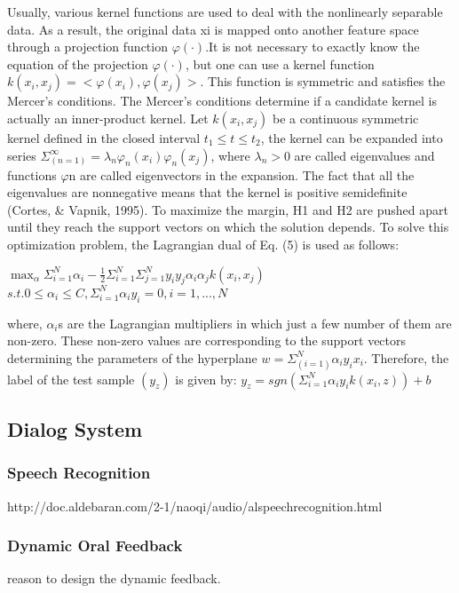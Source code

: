 Usually, various kernel functions are used to deal with the nonlinearly separable data. 
As a result, the original data xi is mapped onto another feature space through a 
projection function ${\varphi(\cdot)}$.It is not necessary to exactly know the equation of the 
projection ${\varphi(\cdot)}$, but one can use a kernel function ${k(x_i,x_j)=<\varphi(x_i),\varphi(x_j)>}$. 
This function is symmetric and satisfies the Mercer’s conditions. The Mercer’s conditions determine 
if a candidate kernel is actually an inner-product kernel. Let ${k(x_i,x_j)}$ be a continuous 
symmetric kernel defined in the closed interval ${t_1\leq t\leq t_2}$, the kernel can be expanded 
into series ${\Sigma_(n=1)^\infty = \lambda_n\varphi_n(x_i)\varphi_n(x_j)}$, where 
${\lambda_n > 0}$ are called eigenvalues and functions $\varphi$n are called eigenvectors in the expansion. 
The fact that all the eigenvalues are nonnegative means that the kernel is positive 
semidefinite (Cortes, \& Vapnik, 1995). 
To maximize the margin, H1 and H2 are pushed apart until they reach the support vectors 
on which the solution depends. To solve this optimization problem, the Lagrangian dual 
of Eq. (5) is used as follows:

$\max_\alpha \Sigma_{i=1}^{N} \alpha_i - \frac{1}{2} \Sigma_{i=1}^{N} \Sigma_{j=1}^{N} y_i y_j \alpha_i \alpha_j k(x_i, x_j)$\newline
$s.t. 0 \le \alpha_i \le C, \Sigma_{i=1}^{N} \alpha_i y_i = 0, i = 1, ..., N$\newline

where, ${\alpha_i}$s are the Lagrangian multipliers in which just a few number of them are 
non-zero. These non-zero values are corresponding to the support vectors determining 
the parameters of the hyperplane ${w = \Sigma_(i=1)^N\alpha_iy_ix_i }$. Therefore, the label 
of the test sample ${(y_z)}$ is given by:
$y_z = sgn(\Sigma_{i=1}^{N} \alpha_i y_i k(x_i, z)) + b$\newline

\subsection{Dialog System}

\subsubsection{Speech Recognition}
http://doc.aldebaran.com/2-1/naoqi/audio/alspeechrecognition.html

\subsubsection{Dynamic Oral Feedback}
reason to design the dynamic feedback. 

\